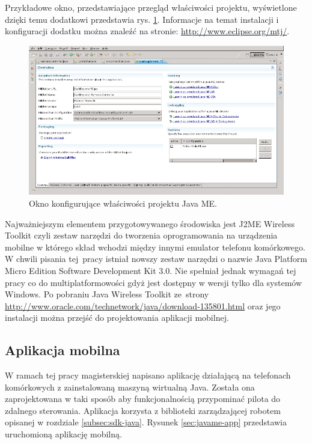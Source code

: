 Przykładowe okno, przedstawiające
przegląd właściwości projektu, wyświetlone dzięki temu dodatkowi przedstawia rys.
\ref{fig:MobTools4J}. Informacje na temat instalacji i konfiguracji dodatku można
znaleźć na stronie: \url{http://www.eclipse.org/mtj/}.

\begin{figure}[!ht]
 \centering
 \includegraphics[width=\textwidth]{../images/ch05/mobile_tools_4_j.png}
 \caption{Okno konfigurujące właściwości projektu Java ME.}
 \label{fig:MobTools4J}
\end{figure}

Najważniejszym elementem przygotowywanego środowiska jest J2ME Wireless Toolkit
czyli zestaw narzędzi do tworzenia oprogramowania na urządzenia mobilne w którego
skład wchodzi między innymi emulator telefonu komórkowego. W chwili pisania tej~pracy istniał nowszy zestaw narzędzi o nazwie Java Platform Micro Edition
Software Development Kit 3.0. Nie spełniał jednak wymagań tej pracy co do
multiplatformowości gdyż jest dostępny w wersji tylko dla systemów Windows. Po
pobraniu Java Wireless Toolkit ze~strony
\url{http://www.oracle.com/technetwork/java/download-135801.html} oraz jego
instalacji można przejść do projektowania aplikacji mobilnej.

\subsection{Aplikacja mobilna}
W ramach tej pracy magisterskiej napisano aplikację działającą na telefonach
komórkowych z zainstalowaną maszyną wirtualną Java. Została ona zaprojektowana w
taki sposób aby funkcjonalnością przypominać pilota do zdalnego sterowania.
Aplikacja korzysta z biblioteki zarządzającej robotem opisanej w rozdziale
\ref{subsec:sdk-java}. Rysunek \ref{sec:javame-app} przedstawia uruchomioną aplikację mobilną.

